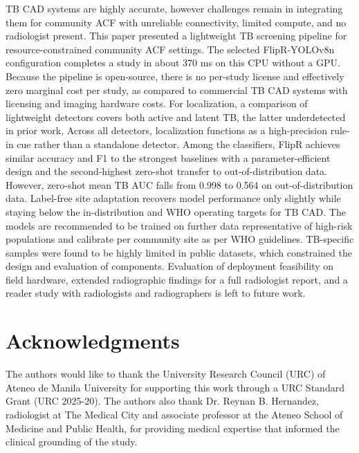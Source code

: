 \documentclass[conference, letterpaper]{IEEEtran}
\begin{document}
TB CAD systems are highly accurate, however challenges remain in integrating them for community ACF with unreliable connectivity, limited compute, and no radiologist present. This paper presented a lightweight TB screening pipeline for resource-constrained community ACF settings. The selected FlipR-YOLOv8n configuration completes a study in about 370 ms on this CPU without a GPU. Because the pipeline is open-source, there is no per-study license and effectively zero marginal cost per study, as compared to commercial TB CAD systems with licensing and imaging hardware costs. For localization, a comparison of lightweight detectors covers both active and latent TB, the latter underdetected in prior work, Across all detectors, localization functions as a high-precision rule-in cue rather than a standalone detector. Among the classifiers, FlipR achieves similar accuracy and F1 to the strongest baselines with a parameter-efficient design and the second-highest zero-shot transfer to out-of-distribution data. However, zero-shot mean TB AUC falls from 0.998 to 0.564 on out-of-distribution data. Label-free site adaptation recovers model performance only slightly while staying below the in-distribution and WHO operating targets for TB CAD. The models are recommended to be trained on further data representative of high-risk populations and calibrate per community site as per WHO guidelines. TB-specific samples were found to be highly limited in public datasets, which constrained the design and evaluation of components. Evaluation of deployment feasibility on field hardware, extended radiographic findings for a full radiologist report, and a reader study with radiologists and radiographers is left to future work.

\section*{Acknowledgments}

The authors would like to thank the University Research Council (URC) of Ateneo de Manila University for supporting this work through a URC Standard Grant (URC 2025-20). The authors also thank Dr. Reynan B. Hernandez, radiologist at The Medical City and associate professor at the Ateneo School of Medicine and Public Health, for providing medical expertise that informed the clinical grounding of the study.

\end{document}
